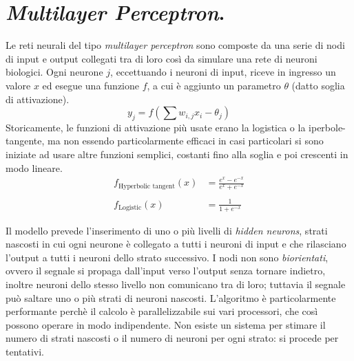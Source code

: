 \documentclass[11pt, a4page, twocolumn]{article}
\begin{document}
\section{\textit{Multilayer Perceptron}.}
Le reti neurali del tipo \textit{multilayer perceptron} sono composte da una serie di nodi di input e output collegati tra di loro così da simulare una rete di neuroni biologici.
Ogni neurone $j$, eccettuando i neuroni di input, riceve in ingresso un valore $x$ ed esegue una funzione $f$, a cui è aggiunto un parametro $\theta$ (datto soglia di attivazione).
\begin{equation*}
  y_j = f( \sum{}{}{w_{i,j} x_i - \theta_j})
\end{equation*}
Storicamente, le funzioni di attivazione più usate erano la logistica o la iperbole-tangente, ma non essendo particolarmente efficaci in casi particolari si sono iniziate ad usare altre funzioni semplici, costanti fino alla soglia e poi crescenti in modo lineare.
\begin{align*}
  f_{\text{Hyperbolic tangent}}(x) &= \frac{e^x - e^{-x}}{e^x + e^{-x}} \\ \\
  f_{\text{Logistic}}(x) &= \frac{1}{1 + e^{-x}}
\end{align*}

Il modello prevede l'inserimento di uno o più livelli di \textit{hidden neurons}, strati nascosti in cui ogni neurone è collegato a tutti i neuroni di input e che rilasciano l'output a tutti i neuroni dello strato successivo.
I nodi non sono \textit{biorientati}, ovvero il segnale si propaga dall'input verso l'output senza tornare indietro, inoltre neuroni dello stesso livello non comunicano tra di loro; tuttavia il segnale può saltare uno o più strati di neuroni nascosti.
L'algoritmo è particolarmente performante perchè il calcolo è parallelizzabile sui vari processori, che così possono operare in modo indipendente.
Non esiste un sistema per stimare il numero di strati nascosti o il numero di neuroni per ogni strato: si procede per tentativi.
\end{document}
